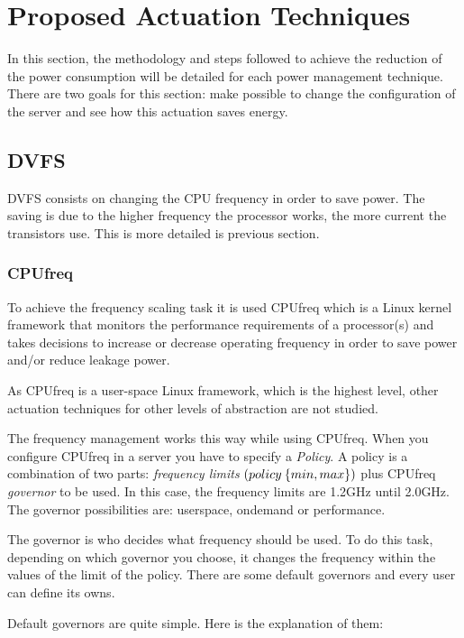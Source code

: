 \section{Proposed Actuation Techniques}

In this section, the methodology and steps followed to achieve the reduction of the power consumption will be detailed for each power management technique. There are two goals for this section: make possible to change the configuration of the server and see how this actuation saves energy.

\subsection{DVFS}

DVFS consists on changing the CPU frequency in order to save power. The saving is due to the higher frequency the processor works, the more current the transistors use. This is more detailed is previous section.

\subsubsection{CPUfreq}

To achieve the frequency scaling task it is used CPUfreq which is a Linux kernel framework that monitors the performance requirements of a processor(s) and takes decisions to increase or decrease operating frequency in order to save power and/or reduce leakage power.

As CPUfreq is a user-space Linux framework, which is the highest level, other actuation techniques for other levels of abstraction are not studied. 

The frequency management works this way while using CPUfreq. When you configure CPUfreq in a server you have to specify a \emph{Policy}. A policy is a combination of two parts: \emph{frequency limits} $(policy\-\>\{min,max\})$ plus CPUfreq \emph{governor} to be used. In this case, the frequency limits are 1.2GHz until 2.0GHz. The governor possibilities are: userspace, ondemand or performance.

The governor is who decides what frequency should be used. To do this task, depending on which governor you choose, it changes the frequency within the values of the limit of the policy. There are some default governors and every user can define its owns.

Default governors are quite simple. Here is the explanation of them:

